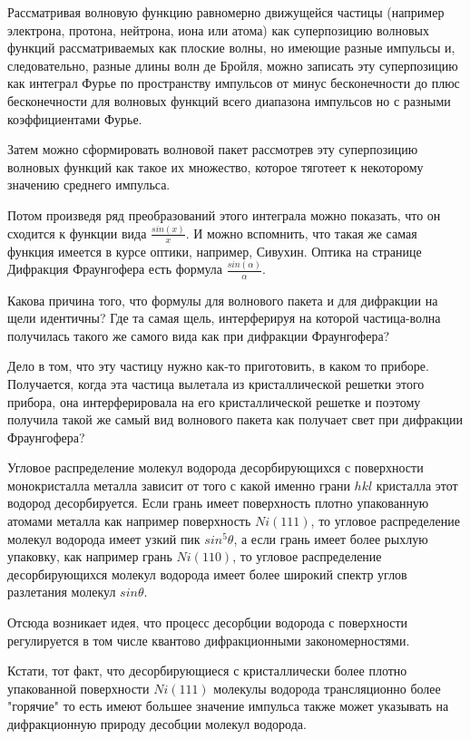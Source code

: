 \documentclass[11pt]{article}
\begin{document}
    Рассматривая волновую функцию равномерно движущейся частицы (например
электрона, протона, нейтрона, иона или атома) как суперпозицию волновых
функций рассматриваемых как плоские волны, но имеющие разные импульсы и,
следовательно, разные длины волн де Бройля, можно записать эту
суперпозицию как интеграл Фурье по пространству импульсов от минус
бесконечности до плюс бесконечности для волновых функций всего диапазона
импульсов но с разными коэффициентами Фурье.

Затем можно сформировать волновой пакет рассмотрев эту суперпозицию
волновых функций как такое их множество, которое тяготеет к некоторому
значению среднего импульса.

Потом произведя ряд преобразований этого интеграла можно показать, что
он сходится к функции вида \(\frac{sin(x)}{x}\). И можно вспомнить, что
такая же самая функция имеется в курсе оптики, например, Сивухин. Оптика
на странице Дифракция Фраунгофера есть формула
\(\frac{sin(\alpha)}{\alpha}\).

Какова причина того, что формулы для волнового пакета и для дифракции на
щели идентичны? Где та самая щель, интерферируя на которой частица-волна
получилась такого же самого вида как при дифракции Фраунгофера?

Дело в том, что эту частицу нужно как-то приготовить, в каком то
приборе. Получается, когда эта частица вылетала из кристаллической
решетки этого прибора, она интерферировала на его кристаллической
решетке и поэтому получила такой же самый вид волнового пакета как
получает свет при дифракции Фраунгофера?

Угловое распределение молекул водорода десорбирующихся с поверхности
монокристалла металла зависит от того с какой именно грани \(hkl\)
кристалла этот водород десорбируется. Если грань имеет поверхность
плотно упакованную атомами металла как например поверхность \(Ni(111)\),
то угловое распределение молекул водорода имеет узкий пик
\(sin^5 \theta\), а если грань имеет более рыхлую упаковку, как например
грань \(Ni(110)\), то угловое распределение десорбирующихся молекул
водорода имеет более широкий спектр углов разлетания молекул
\(sin \theta\).

Отсюда возникает идея, что процесс десорбции водорода с поверхности
регулируется в том числе квантово дифракционными закономерностями.

Кстати, тот факт, что десорбирующиеся с кристаллически более плотно
упакованной поверхности \(Ni(111)\) молекулы водорода трансляционно
более "горячие" то есть имеют большее значение импульса также может
указывать на дифракционную природу десобции молекул водорода.
\end{document}

